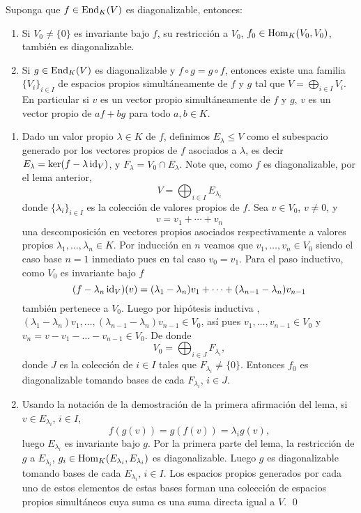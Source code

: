 \begin{lema}
Suponga que $f\in\operatorname{End}_K(V)$ es diagonalizable, entonces:
\begin{enumerate}
\item Si $V_0\ne\{0\}$ es invariante bajo $f$, su restricci\'on a $V_0$, $f_0\in\operatorname{Hom}_K(V_0,V_0)$, tambi\'en es diagonalizable. 
\item Si  $g\in\operatorname{End}_K(V)$ es diagonalizable y $f\circ g=g\circ f$, entonces existe una familia $\{V_i\}_{i\in I}$ de espacios propios simult\'aneamente de $f$ y $g$ tal que $V=\bigoplus_{i\in I}V_i$. En particular si $v$ es un vector propio simult\'aneamente de $f$ y $g$, $v$ es un vector propio de $af+bg$ para todo $a,b\in K$.
\end{enumerate}
\end{lema} 

\dem \begin{enumerate}
\item Dado un valor propio $\lambda\in K$ de $f$, definimos $E_\lambda\le V$ como el subespacio generado por los vectores propios de $f$ asociados a $\lambda$, es decir $E_\lambda=\ker(f-\lambda\operatorname{id}_V)$, y $F_\lambda=V_0\cap E_\lambda$. Note que, como $f$ es diagonalizable, por el lema anterior,
\[
V=\bigoplus_{i\in I} E_{\lambda_i}
\]
donde $\{\lambda_i\}_{i\in I}$ es la colecci\'on de valores propios de $f$. Sea $v\in V_0$, $v\ne 0$, y
\[
v=v_1+\cdots+v_n
\]
una descomposici\'on en vectores propios asociados respectivamente a valores propios $\lambda_1, \ldots , \lambda_n\in K$. Por inducci\'on en $n$ veamos que $v_1,\ldots,v_n\in V_0$ siendo el caso base $n=1$ inmediato pues en tal caso $v_0=v_1$. Para el paso inductivo, como $V_0$ es invariante bajo $f$
\[
(f-\lambda_n\operatorname{id}_V)(v)=(\lambda_1-\lambda_n)v_1+\cdots+(\lambda_{n-1}-\lambda_{n})v_{n-1}
\]
tambi\'en pertenece a $V_0$. Luego por hip\'otesis inductiva , $(\lambda_1-\lambda_n)v_1, \ldots, (\lambda_{n-1}-\lambda_{n})v_{n-1}\in V_0$, as\'i pues $v_1, \ldots, v_{n-1}\in V_0$ y $v_n=v-v_1-\ldots-v_{n-1}\in V_0$. De donde
\[
V_0=\bigoplus_{i\in J} F_{\lambda_i},
\]
donde $J$ es la colecci\'on de $i\in I$ tales que $F_{\lambda_i}\ne\{0\}$. Entonces $f_0$ es diagonalizable tomando bases de cada $F_{\lambda_i}$, $i\in J$.
\item Usando la notaci\'on de la demostraci\'on de la primera afirmaci\'on del lema, si $v\in E_{\lambda_i}$, $i\in I$,
\[
f\left(g(v)\right)=g\left(f(v)\right)=\lambda_ig(v),
\]
luego $E_{\lambda_i}$ es invariante bajo $g$. Por la primera parte del lema, la restricci\'on de $g$ a $E_{\lambda_i}$, $g_i\in\operatorname{Hom}_K (E_{\lambda_i},E_{\lambda_i})$ es diagonalizable. Luego $g$ es diagonalizable tomando bases de cada $E_{\lambda_i}$, $i\in I$. Los espacios propios generados por cada uno de estos elementos de estas bases forman una colecci\'on de espacios propios simult\'aneos cuya suma es una suma directa igual a $V$. \qed 
\end{enumerate}   

